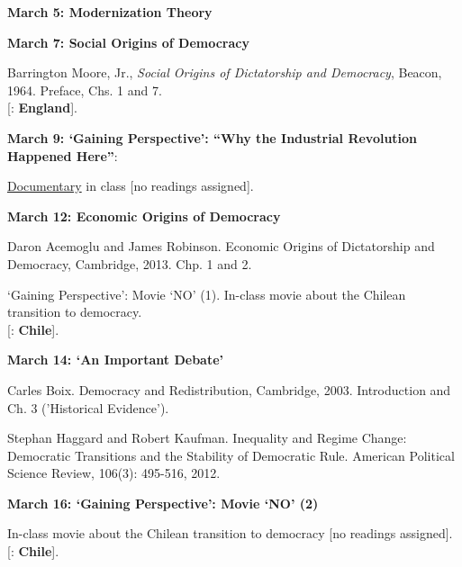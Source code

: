 \documentclass[letterpaper]{article}
\renewenvironment{itemize}{
  \begin{list}{}{
    \setlength{\leftmargin}{1.5em}
  }
}{
  \end{list}
}
\begin{document}
\begin{enumerate}
\begin{itemize} {\bf March 5: Modernization Theory}
		\item {\bf March 7: Social Origins of Democracy}
				\begin{itemize}
					\item[$\bullet$] Barrington Moore, Jr., \emph{Social Origins of Dictatorship and Democracy}, Beacon, 1964. Preface, Chs. 1 and 7.\\
			{\color{brown}[\faGlobe: {\bf England}].}

				\end{itemize}

		\item {\bf March 9: `Gaining Perspective': ``Why the Industrial Revolution Happened Here''}:
				\begin{itemize}
					\item[$\bullet$] \href{https://www.youtube.com/watch?v=UM2Aw4kmA0s}{Documentary} in class [no readings assigned].
				\end{itemize}
				
		\item {\bf March 12: Economic Origins of Democracy}
 				\begin{itemize}
					\item[$\bullet$] Daron Acemoglu and James Robinson. Economic Origins of Dictatorship and Democracy, Cambridge, 2013. Chp. 1 and 2.
					\item[$\bullet$] `Gaining Perspective': Movie `NO' (1). In-class movie about the Chilean transition to democracy.\\
			{\color{brown}[\faGlobe: {\bf Chile}].}
				\end{itemize}

		\item {\bf March 14: `An Important Debate'}
 				\begin{itemize}
					\item[$\bullet$] Carles Boix. Democracy and Redistribution, Cambridge, 2003. Introduction and Ch. 3 ('Historical Evidence').
					\item[$\bullet$] Stephan Haggard and Robert Kaufman. Inequality and Regime Change: Democratic Transitions and the Stability of Democratic Rule. American Political Science Review, 106(3): 495-516, 2012.
				\end{itemize}

		\item {\bf March 16: `Gaining Perspective': Movie `NO' (2)}
 				\begin{itemize}
					\item[$\bullet$] In-class movie about the Chilean transition to democracy [no readings assigned].\\
			{\color{brown}[\faGlobe: {\bf Chile}].}


\end{itemize}
\end{itemize}
\end{enumerate}
\end{document}
